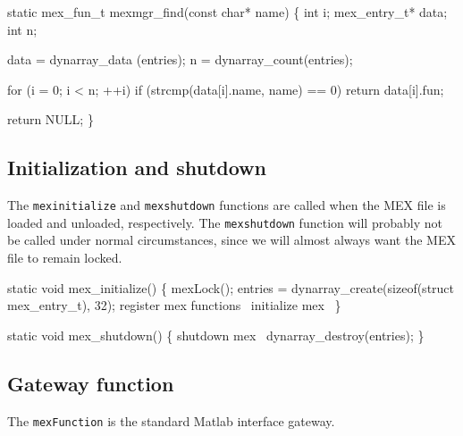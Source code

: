\nwenddocs{}\plusendmoddef
static mex_fun_t mexmgr_find(const char* name)
\{
    int i;
    mex_entry_t* data;
    int          n;

    data = dynarray_data (entries);
    n    = dynarray_count(entries);

    for (i = 0; i < n; ++i)
        if (strcmp(data[i].name, name) == 0)
            return data[i].fun;

    return NULL;
\}

\nwendcode{}\nwdocspar


\subsection{Initialization and shutdown}

The {\tt{}mex{}initialize} and {\tt{}mex{}shutdown} functions are called
when the MEX file is loaded and unloaded, respectively.
The {\tt{}mex{}shutdown} function will probably not be called under
normal circumstances, since we will almost always want the MEX
file to remain locked.

\nwenddocs{}\plusendmoddef
static void mex_initialize()
\{
    mexLock();
    entries = dynarray_create(sizeof(struct mex_entry_t), 32);
    \LA{}register mex functions~{\nwtagstyle{}}\RA{}
    \LA{}initialize mex~{\nwtagstyle{}}\RA{}
\}

\nwendcode{}\nwdocspar

\nwenddocs{}\plusendmoddef
static void mex_shutdown()
\{
    \LA{}shutdown mex~{\nwtagstyle{}}\RA{}
    dynarray_destroy(entries);
\}

\nwendcode{}\nwdocspar


\subsection{Gateway function}

The {\tt{}mexFunction} is the standard Matlab interface gateway.


